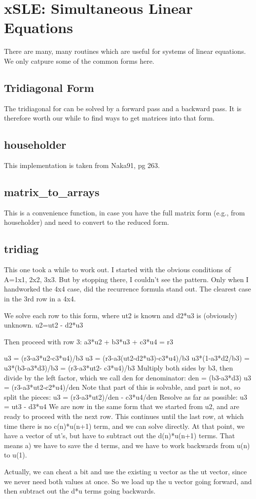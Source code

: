 \section{xSLE: Simultaneous Linear Equations}
There are many, many routines which are useful for systems of
linear equations.  We only catpure some of the common forms here.

\subsection{Tridiagonal Form}
The tridiagonal for can be solved by a forward pass and a backward pass.
It is therefore worth our while to find ways to get matrices into that
form.  

\subsection*{householder}
This implementation is taken from Naka91, pg 263.

\subsection*{matrix\_to\_arrays}
This is a convenience function, in case you have the full matrix form
(e.g., from householder) and need to convert to the reduced form.

\subsection*{tridiag}
This one took a while to work out.  I started with
the obvious conditions of A=1x1, 2x2, 3x3.  But by stopping
there, I couldn't see the pattern.  Only when I handworked
the 4x4 case, did the recurrence formula stand out.  The
clearest case in the 3rd row in a 4x4.

We solve each row to this form, where ut2 is known and d2*u3
is (obviously) unknown.
     u2=ut2 - d2*u3

Then proceed with row 3:
     a3*u2 + b3*u3 + c3*u4 = r3
     
     u3 = (r3-a3*u2-c3*u4)/b3
     u3 = (r3-a3(ut2-d2*u3)-c3*u4)/b3
     u3*(1-a3*d2/b3) = u3*(b3-a3*d3)/b3 = (r3-a3*ut2-
     c3*u4)/b3
Multiply both sides by b3, then divide by the left factor,
which we call den for denominator:
     den = (b3-a3*d3)
     u3 = (r3-a3*ut2-c2*u4)/den
Note that part of this is solvable, and part is not, so
split the pieces:
     u3 = (r3-a3*ut2)/den - c3*u4/den
Resolve as far as possible:
     u3 = ut3 - d3*u4
We are now in the same form that we started from u2, and are
ready to proceed with the next row.  This continues until
the last row, at which time there is no c(n)*u(n+1) term,
and we can solve directly.  At that point, we have a vector
of ut's, but have to subtract out the d(n)*u(n+1) terms.
That means a) we have to save the d terms, and we have to
work backwards from u(n) to u(1).

Actually, we can cheat a bit and use the existing u vector
as the ut vector, since we never need both values at once.
So we load up the u vector going forward, and then subtract
out the d*u terms going backwards.

